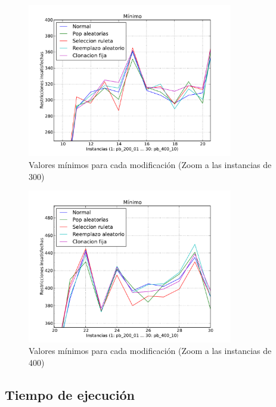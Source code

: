 \begin{figure}[H]
\begin{center}
\includegraphics[width=0.8\textwidth]{img/min-zoom300.pdf}
\end{center}
\caption{Valores mínimos para cada modificación (Zoom a las instancias de 300)}
\label{fig:min300}
\end{figure}

\begin{figure}[H]
\begin{center}
\includegraphics[width=0.8\textwidth]{img/min-zoom400.pdf}
\end{center}
\caption{Valores mínimos para cada modificación (Zoom a las instancias de 400)}
\label{fig:min400}
\end{figure}

\newpage
\subsection{Tiempo de ejecución}


